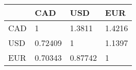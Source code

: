 \begin{tabular}{llll}
& CAD & USD & EUR \\ 
\hline 
CAD & 1 & 1.3811 & 1.4216 \\ 
USD & 0.72409 & 1 & 1.1397 \\ 
EUR & 0.70343 & 0.87742 & 1 \\ 
\hline 
\end{tabular}